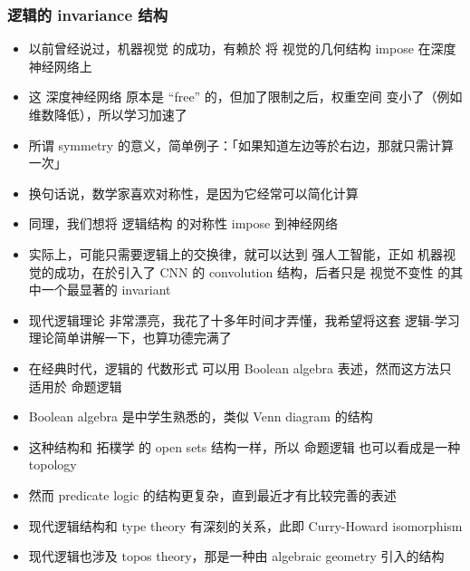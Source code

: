 \documentclass[16pt]{beamer}
\begin{document}
\begin{frame}
\frametitle{逻辑的 invariance 结构}
\begin{itemize}
	\item 以前曾经说过，机器视觉 的成功，有赖於 将 视觉的几何结构 impose 在深度神经网络上
	\item 这 深度神经网络 原本是 ``free'' 的，但加了限制之后，权重空间 变小了（例如维数降低），所以学习加速了
	\item 所谓 symmetry 的意义，简单例子：「如果知道左边等於右边，那就只需计算一次」
	\item 换句话说，数学家喜欢对称性，是因为它经常可以简化计算
	\item 同理，我们想将 逻辑结构 的对称性 impose 到神经网络
	\item 实际上，可能只需要逻辑上的交换律，就可以达到 强人工智能，正如 机器视觉的成功，在於引入了 CNN 的 convolution 结构，后者只是 视觉不变性 的其中一个最显著的 invariant
	\item 现代逻辑理论 非常漂亮，我花了十多年时间才弄懂，我希望将这套 逻辑-学习 理论简单讲解一下，也算功德完满了
\end{itemize}
\end{frame}

\begin{frame}[plain]
\begin{itemize}
\item 在经典时代，逻辑的 代数形式 可以用 Boolean algebra 表述，然而这方法只适用於 命题逻辑
\item Boolean algebra 是中学生熟悉的，类似 Venn diagram 的结构
\item 这种结构和 拓樸学 的 open sets 结构一样，所以 命题逻辑 也可以看成是一种 topology
\item 然而 predicate logic 的结构更复杂，直到最近才有比较完善的表述
\item 现代逻辑结构和 type theory 有深刻的关系，此即 Curry-Howard isomorphism
\item 现代逻辑也涉及 topos theory，那是一种由 algebraic geometry 引入的结构
\end{itemize}
\end{frame}
\end{document}
